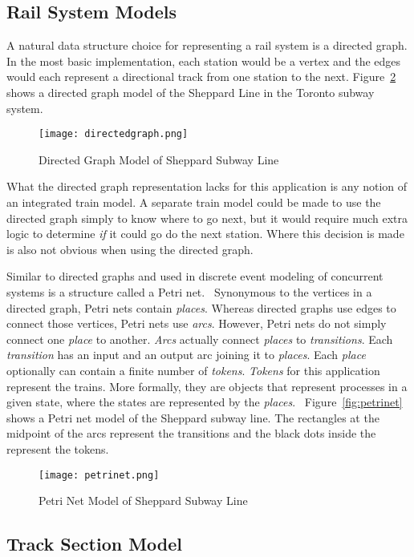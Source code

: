 \subsection{Rail System Models}
A natural data structure choice for representing a rail system is a directed graph.  In the most basic implementation, each station would be a vertex and the edges would each represent a directional track from one station to the next. Figure~\ref{fig:directedgraph} shows a directed graph model of the Sheppard Line in the Toronto subway system.
\begin{figure}[htb]
	\centering
	\texttt{[image: directedgraph.png]}
	\caption{Directed Graph Model of Sheppard Subway Line}
	\label{fig:directedgraph}
\end{figure}
What the directed graph representation lacks for this application is any notion of an integrated train model. A separate train model could be made to use the directed graph simply to know where to go next, but it would require much extra logic to determine \textit{if} it could go do the next station.  Where this decision is made is also not obvious when using the directed graph.

Similar to directed graphs and used in discrete event modeling of concurrent systems is a structure called a Petri net.~\cite{Petri62}  Synonymous to the vertices in a directed graph, Petri nets contain \textit{places}.  Whereas directed graphs use edges to connect those vertices, Petri nets use \textit{arcs}. However, Petri nets do not simply connect one \textit{place} to another.  \textit{Arcs} actually connect \textit{places} to \textit{transitions}. Each \textit{transition} has an input and an output arc joining it to \textit{places}.  Each \textit{place} optionally can contain a finite number of \textit{tokens}.  \textit{Tokens} for this application represent the trains.  More formally, they are objects that represent processes in a given state, where the states are represented by the \textit{places}.~\cite{Kristoffersen2003}  Figure~\ref{fig:petrinet} shows a Petri net model of the Sheppard subway line. The rectangles at the midpoint of the arcs represent the transitions and the black dots inside the represent the tokens.
\begin{figure}[htb]
	\centering
	\texttt{[image: petrinet.png]}
	\caption{Petri Net Model of Sheppard Subway Line}
	\label{fig:directedgraph}
\end{figure}

\subsection{Track Section Model}

